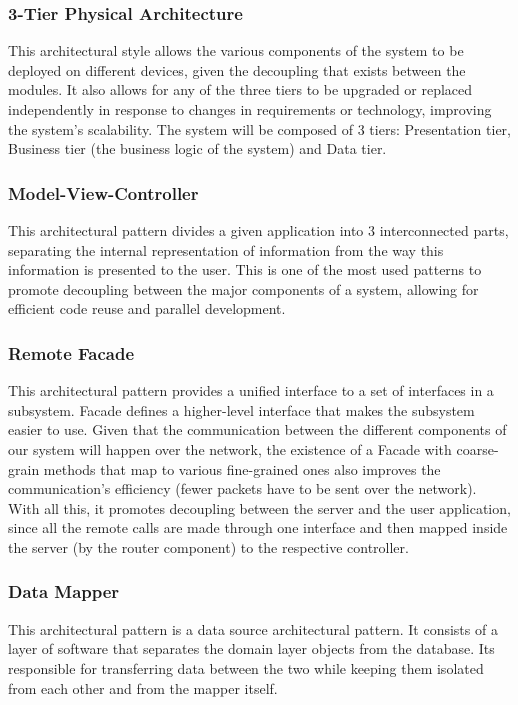 \documentclass[12pt]{article}
\begin{document}
\subsubsection{3-Tier Physical Architecture} This architectural style allows the various components of the system to be deployed on different devices, given the decoupling that exists between the modules. It also allows for any of the three tiers to be upgraded or replaced independently in response to changes in requirements or technology, improving the system's scalability. The system will be composed of 3 tiers: Presentation tier, Business tier (the business logic of the system) and Data tier.

\subsubsection{Model-View-Controller} This architectural pattern divides a given application into 3 interconnected parts, separating the internal representation of information from the way this information is presented to the user. This is one of the most used patterns to promote decoupling between the major components of a system, allowing for efficient code reuse and parallel development.

\subsubsection{Remote Facade} This architectural pattern provides a unified interface to a set of interfaces in a subsystem. Facade defines a higher-level interface that makes the subsystem easier to use. Given that the communication between the different components of our system will happen over the network, the existence of a Facade with coarse-grain methods that map to various fine-grained ones also improves the communication's efficiency (fewer packets have to be sent over the network). With all this, it promotes decoupling between the server and the user application, since all the remote calls are made through one interface and then mapped inside the server (by the router component) to the respective controller.

\subsubsection{Data Mapper} This architectural pattern is a data source architectural pattern. It consists of a layer of software that separates the domain layer objects from the database. Its responsible for transferring data between the two while keeping them isolated from each other and from the mapper itself.
\end{document}
